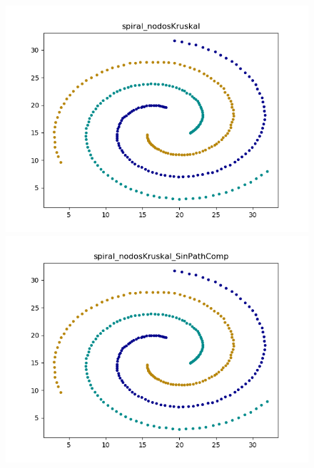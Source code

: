 \documentclass[11pt,a4paper]{article}
\begin{document}
\begin{figure}[!htb]
   \begin{minipage}{0.45\textwidth}
     \centering
     \includegraphics[scale=.5]{graficos/spiral_nodosKruskal.png}
   \end{minipage}\hfill
   \begin{minipage}{0.45\textwidth}
     \centering
     \includegraphics[scale=.5]{graficos/spiral_nodosKruskal_SinPathComp.png}
   \end{minipage}\hfill
   
\end{figure}
\end{document}
